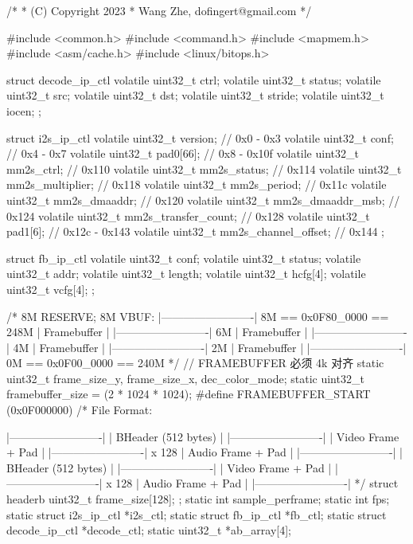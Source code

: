 \begin{CodeBlock}[language=BookC]
/*
 * (C) Copyright 2023
 * Wang Zhe, dofingert@gmail.com
 */

#include <common.h>
#include <command.h>
#include <mapmem.h>
#include <asm/cache.h>
#include <linux/bitops.h>

struct decode_ip_ctl
{
    volatile uint32_t ctrl;
    volatile uint32_t status;
    volatile uint32_t src;
    volatile uint32_t dst;
    volatile uint32_t stride;
    volatile uint32_t iocen;
};

struct i2s_ip_ctl
{
    volatile uint32_t version;         // 0x0 - 0x3
    volatile uint32_t conf;            // 0x4 - 0x7
    volatile uint32_t pad0[66];      // 0x8 - 0x10f
    volatile uint32_t mm2s_ctrl;       // 0x110
    volatile uint32_t mm2s_status;     // 0x114
    volatile uint32_t mm2s_multiplier; // 0x118
    volatile uint32_t mm2s_period;     // 0x11c
    volatile uint32_t mm2s_dmaaddr;    // 0x120
    volatile uint32_t mm2s_dmaaddr_msb; // 0x124
    volatile uint32_t mm2s_transfer_count; // 0x128
    volatile uint32_t pad1[6];             // 0x12c - 0x143
    volatile uint32_t mm2s_channel_offset; // 0x144
};

struct fb_ip_ctl
{
    volatile uint32_t conf;
    volatile uint32_t status;
    volatile uint32_t addr;
    volatile uint32_t length;
    volatile uint32_t hcfg[4];
    volatile uint32_t vcfg[4];
};

/*
    8M RESERVE;
    8M VBUF:
    |-------------------------|  8M == 0x0F80_0000 == 248M
    | Framebuffer             |
    |-------------------------|  6M
    | Framebuffer             |
    |-------------------------|  4M
    | Framebuffer             |
    |-------------------------|  2M
    | Framebuffer             |
    |-------------------------|  0M == 0x0F00_0000 == 240M
*/
// FRAMEBUFFER 必须 4k 对齐
static uint32_t frame_size_y, frame_size_x, dec_color_mode;
static uint32_t framebuffer_size = (2 * 1024 * 1024);
#define FRAMEBUFFER_START (0x0F000000)
/*
    File Format:

    |-------------------------|
    | BHeader (512 bytes)     |
    |-------------------------|
    | Video Frame + Pad       |
    |-------------------------|  x 128
    | Audio Frame + Pad       |
    |-------------------------|
    | BHeader (512 bytes)     |
    |-------------------------|
    | Video Frame + Pad       |
    |-------------------------|  x 128
    | Audio Frame + Pad       |
    |-------------------------|
*/
struct headerb
{
    uint32_t frame_size[128];
};
static int sample_perframe;
static int fps;
static struct i2s_ip_ctl *i2s_ctl;
static struct fb_ip_ctl  *fb_ctl;
static struct decode_ip_ctl *decode_ctl;
static uint32_t *ab_array[4];


\end{CodeBlock}

